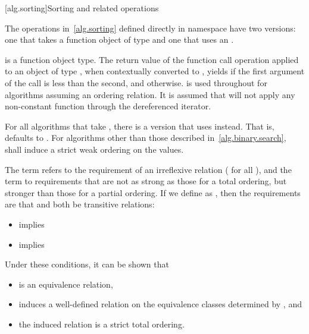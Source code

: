 [alg.sorting]{Sorting and related operations}

\pnum
The operations in~\ref{alg.sorting} defined directly in namespace 
have two versions: one that takes a function object of type
and one that uses an
.

\pnum
{}
is a function object
type. The return value of the function call operation applied to
an object of type , when contextually converted to
,
yields  if the first argument of the call
is less than the second, and
otherwise.
is used throughout for algorithms assuming an ordering relation.
It is assumed that
will not apply any non-constant function through the dereferenced iterator.

\pnum
For all algorithms that take
,
there is a version that uses
instead.
That is,
defaults to
.
For algorithms other than those described in~\ref{alg.binary.search},
 shall induce a strict weak ordering on the values.

\pnum
The term
refers to the
requirement of an irreflexive relation ( for all ),
and the term
to requirements that are not as strong as
those for a total ordering,
but stronger than those for a partial
ordering.
If we define
as
,
then the requirements are that
and
both be transitive  relations:

\begin{itemize}
\item
{}
implies
\item
{}
implies
\end{itemize}
\begin{note}
Under these conditions, it can be shown that
\begin{itemize}
\item
{}
is an equivalence relation,
\item
{}
induces a well-defined relation on the equivalence
classes determined by
, and
\item
the induced relation is a strict total ordering.
\end{itemize}
\end{note}

